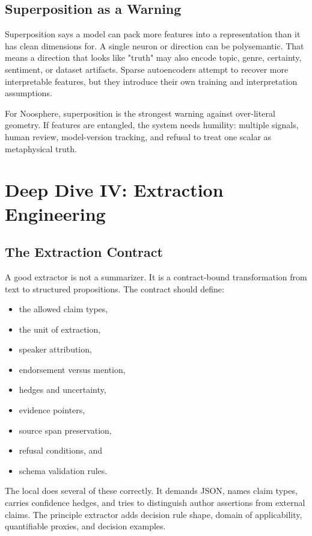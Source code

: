 \documentclass[11pt]{article}
\newcommand{\code}[1]{\texttt{\detokenize{#1}}}
\begin{document}
\subsection{Superposition as a Warning}

Superposition says a model can pack more features into a representation than it
has clean dimensions for. A single neuron or direction can be polysemantic. That
means a direction that looks like "truth" may also encode topic, genre,
certainty, sentiment, or dataset artifacts. Sparse autoencoders attempt to
recover more interpretable features, but they introduce their own training and
interpretation assumptions.

For Noosphere, superposition is the strongest warning against over-literal
geometry. If features are entangled, the system needs humility: multiple
signals, human review, model-version tracking, and refusal to treat one scalar
as metaphysical truth.

\section{Deep Dive IV: Extraction Engineering}

\subsection{The Extraction Contract}

A good extractor is not a summarizer. It is a contract-bound transformation
from text to structured propositions. The contract should define:

\begin{itemize}
\item the allowed claim types,
\item the unit of extraction,
\item speaker attribution,
\item endorsement versus mention,
\item hedges and uncertainty,
\item evidence pointers,
\item source span preservation,
\item refusal conditions, and
\item schema validation rules.
\end{itemize}

The local \code{ClaimExtractor} does several of these correctly. It demands
JSON, names claim types, carries confidence hedges, and tries to distinguish
author assertions from external claims. The principle extractor adds decision
rule shape, domain of applicability, quantifiable proxies, and decision
examples.
\end{document}

